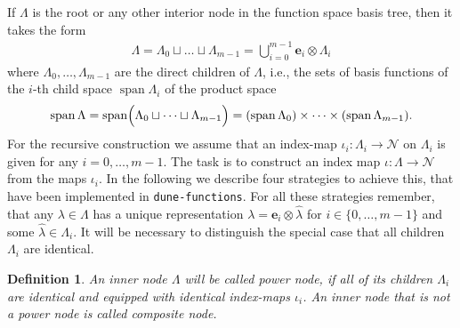 \documentclass[a4paper,10pt,headings=normal,bibliography=totoc]{scrartcl}
\newtheorem{definition}{Definition}
\newcommand{\dunemodule}[1]{\texttt{#1}}
\begin{document}
If $\Lambda$ is the root or any other interior node in the function space basis tree,
then it takes the form
\begin{align*}
  \Lambda = \Lambda_0 \sqcup \dots \sqcup \Lambda_{m-1}
          = \bigcup_{i=0}^{m-1} \mathbf{e}_i \otimes \Lambda_i
\end{align*}
where $\Lambda_0, \dots,\Lambda_{m-1}$ are the direct children of $\Lambda$,
i.e., the sets of basis functions of the $i$-th child
space $\operatorname{span} \Lambda_i$ of the product space
\begin{align*}
  \operatorname{span} \Lambda
    = \operatorname{span} \Bigl( \Lambda_0 \sqcup \dots \sqcup \Lambda_{m-1} \Bigr)
    = (\operatorname{span} \Lambda_0) \times \dots \times (\operatorname{span} \Lambda_{m-1}).
\end{align*}
For the recursive construction we assume that an index-map
$\iota_i : \Lambda_i \to \mathcal{N}$ on $\Lambda_i$ is given for any $i=0,\dots,m-1$.
The task is to construct an index map $\iota: \Lambda \to \mathcal{N}$
from the maps $\iota_i$.
In the following we describe four strategies to achieve this, that
have been implemented in \dunemodule{dune-functions}. For all these
strategies remember, that any $\lambda \in \Lambda$ has a unique representation
$\lambda = \mathbf{e}_i \otimes \hat{\lambda}$ for $i \in \{0,\dots,m-1\}$ and some
$\hat{\lambda} \in \Lambda_i$.
It will be necessary to distinguish the special case that all children
$\Lambda_i$ are identical.

\begin{definition}
  An inner node $\Lambda$ will be called \emph{power node}, if all of its children $\Lambda_i$
  are identical and equipped with identical index-maps $\iota_i$.
  An inner node that is not a power node is called \emph{composite node}.
\end{definition}
\end{document}
